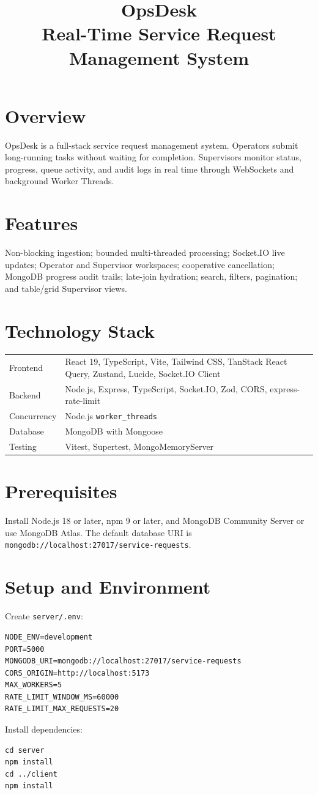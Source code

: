 \documentclass[11pt,a4paper]{article}
\title{OpsDesk\\Real-Time Service Request Management System}
\author{}
\date{}
\begin{document}
\maketitle

\section{Overview}
OpsDesk is a full-stack service request management system. Operators submit long-running tasks without waiting for completion. Supervisors monitor status, progress, queue activity, and audit logs in real time through WebSockets and background Worker Threads.

\section{Features}
Non-blocking ingestion; bounded multi-threaded processing; Socket.IO live updates; Operator and Supervisor workspaces; cooperative cancellation; MongoDB progress audit trails; late-join hydration; search, filters, pagination; and table/grid Supervisor views.

\section{Technology Stack}
\begin{longtable}{p{}p{}}
\toprule
Frontend & React 19, TypeScript, Vite, Tailwind CSS, TanStack React Query, Zustand, Lucide, Socket.IO Client\\
Backend & Node.js, Express, TypeScript, Socket.IO, Zod, CORS, express-rate-limit\\
Concurrency & Node.js \texttt{worker\_threads}\\
Database & MongoDB with Mongoose\\
Testing & Vitest, Supertest, MongoMemoryServer\\
\bottomrule
\end{longtable}

\section{Prerequisites}
Install Node.js 18 or later, npm 9 or later, and MongoDB Community Server or use MongoDB Atlas. The default database URI is \texttt{mongodb://localhost:27017/service-requests}.

\section{Setup and Environment}
Create \texttt{server/.env}:
\begin{verbatim}
NODE_ENV=development
PORT=5000
MONGODB_URI=mongodb://localhost:27017/service-requests
CORS_ORIGIN=http://localhost:5173
MAX_WORKERS=5
RATE_LIMIT_WINDOW_MS=60000
RATE_LIMIT_MAX_REQUESTS=20
\end{verbatim}
Install dependencies:
\begin{verbatim}
cd server
npm install
cd ../client
npm install
\end{verbatim}
\end{document}
